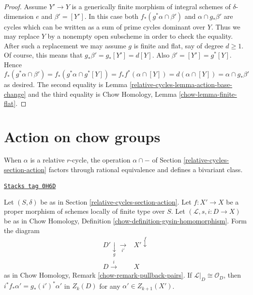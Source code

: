 \begin{proof}
\medskip\noindent
Assume $Y' \to Y$ is a generically finite morphism of integral schemes
of $\delta$-dimension $e$ and $\beta' = [Y']$. In this case both
$f_*(g^*\alpha \cap \beta')$ and $\alpha \cap g_*\beta'$ are cycles
which can be written as a sum of prime cycles dominant over $Y$.
Thus we may replace $Y$ by a nonempty open subscheme in order to
check the equality. After such a replacement we may assume $g$ is
finite and flat, say of degree $d \geq 1$. Of course, this means
that $g_*\beta' = g_*[Y'] = d[Y]$. Also $\beta' = [Y'] = g^*[Y]$. Hence
$$
f_*(g^*\alpha \cap \beta') =
f_*(g^*\alpha \cap g^*[Y]) =
f_*f^*(\alpha \cap [Y]) =
d (\alpha \cap [Y]) =
\alpha \cap g_*\beta'
$$
as desired. The second equality is Lemma \ref{relative-cycles-lemma-action-base-change}
and the third equality is Chow Homology, Lemma \ref{chow-lemma-finite-flat}.
\end{proof}

\section{Action on chow groups}
\label{relative-cycles-section-action-chow}
When $\alpha$ is a relative $r$-cycle, the operation $\alpha \cap -$
of Section \ref{relative-cycles-section-action} factors through rational equivalence
and defines a bivariant class.

\begin{lemma}
\label{relative-cycles-lemma-closed-in-X-gysin}
\href{https://stacks.math.columbia.edu/tag/0H6D}{\texttt{Stacks tag 0H6D}}

Let $(S, \delta)$ be as in Section \ref{relative-cycles-section-action}.
Let $f : X' \to X$ be a proper morphism of schemes
locally of finite type over $S$.
Let $(\mathcal{L}, s, i : D \to X)$ be as in
Chow Homology, Definition \ref{chow-definition-gysin-homomorphism}.
Form the diagram
$$
\begin{array}{cc}D' \underset{g}{\downarrow}\underset{i'}{\longrightarrow} & X' \overset{f}{\downarrow} \\ D \overset{i}{\longrightarrow} & X\end{array}
$$
as in Chow Homology, Remark \ref{chow-remark-pullback-pairs}.
If $\mathcal{L}|_D \cong \mathcal{O}_D$, then
$i^*f_*\alpha' = g_*(i')^*\alpha'$ in $Z_k(D)$
for any $\alpha' \in Z_{k + 1}(X')$.
\end{lemma}

